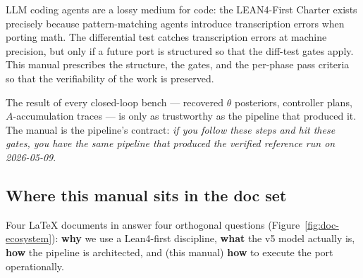 \documentclass[11pt,a4paper]{article}
\begin{document}
LLM coding agents are a lossy medium for code: the LEAN4-First
Charter exists precisely because pattern-matching agents introduce
transcription errors when porting math. The differential test
catches transcription errors at machine precision, but only if a
future port is structured so that the diff-test gates apply. This
manual prescribes the structure, the gates, and the per-phase pass
criteria so that the verifiability of the work is preserved.

The result of every closed-loop bench --- recovered $\theta$
posteriors, controller plans, $A$-accumulation traces --- is only
as trustworthy as the pipeline that produced it. The manual is
the pipeline's contract: \emph{if you follow these steps and hit
these gates, you have the same pipeline that produced the verified
reference run on 2026-05-09}.

\subsection{Where this manual sits in the doc set}
\label{sec:doc-ecosystem}

Four LaTeX documents in  answer
four orthogonal questions
(Figure~\ref{fig:doc-ecosystem}): \textbf{why} we use a Lean4-first
discipline, \textbf{what} the v5 model actually is, \textbf{how} the
pipeline is architected, and (this manual) \textbf{how} to execute
the port operationally.
\end{document}
